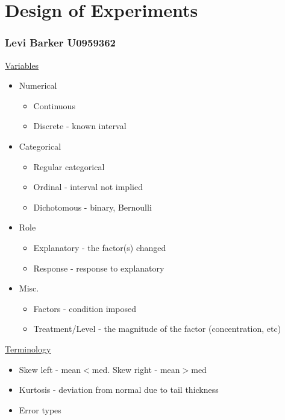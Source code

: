 \documentclass[twocolumn, 12pt]{article}    %
\begin{document}
\RaggedRight
\footnotesize                      %


\section*{Design of Experiments}
\subsubsection*{Levi Barker \hspace{55pt} U0959362}
\underline{Variables}
\begin{itemize}
    \item Numerical
    \begin{itemize}
        \item Continuous
        \item Discrete - known interval
    \end{itemize}
    \item Categorical
    \begin{itemize}
        \item Regular categorical
        \item Ordinal - interval not implied
        \item Dichotomous - binary, Bernoulli
    \end{itemize}
    \item Role
    \begin{itemize}
        \item Explanatory - the factor(s) changed
        \item Response - response to explanatory  
    \end{itemize}
    \item Misc.
    \begin{itemize}
        \item Factors - condition imposed
        \item Treatment/Level - the magnitude of the factor (concentration, etc)
    \end{itemize}
\end{itemize}

\underline{Terminology}
\begin{itemize}
    \item Skew left - mean\(<\)med. Skew right - mean\(>\)med
    \item Kurtosis - deviation from normal due to tail thickness
    \item Error types
\end{itemize}
\end{document}
